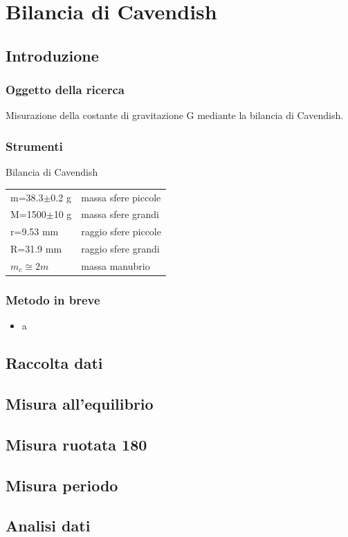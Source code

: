 \documentclass[a4paper,10pt]{report}
\begin{document}
\chapter{Bilancia di Cavendish}
\section{Introduzione}
\subsection{Oggetto della ricerca}
Misurazione della costante di gravitazione G mediante la bilancia di Cavendish.
\subsection{Strumenti}
Bilancia di Cavendish

\begin{tabular}{ll}
m=38.3$\pm$0.2 g & massa sfere piccole\\
M=1500$\pm$10 g	 & massa sfere grandi\\
r=9.53 mm & raggio sfere piccole\\
R=31.9 mm	 & raggio sfere grandi\\
$m_c\cong 2m$ & massa manubrio\\
\end{tabular}

\subsection{Metodo in breve}
\begin{itemize}
\item a
\end{itemize}
\section{Raccolta dati}
\section{Misura all'equilibrio}
\section{Misura ruotata 180}
\section{Misura periodo}
\section{Analisi dati}
\end{document}
